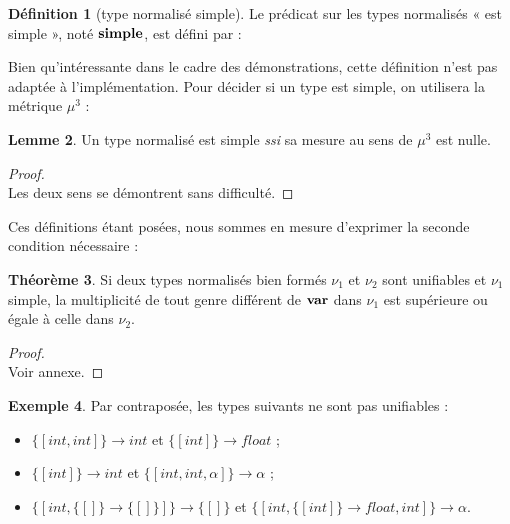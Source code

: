 \documentclass[a4paper]{report}
\newenvironment{preuve} 
  {\begin{proof}~\\} 
  {\end{proof}}
\theoremstyle{definition}
\newtheorem{theoreme}{Théorème}
\newtheorem{definition}[theoreme]{Définition}
\newtheorem{lemme}[theoreme]{Lemme}
\newtheorem{exemple}[theoreme]{Exemple}
\newcommand{\interval}[2]{[\![#1\,;#2]\!]}
\newcommand{\mset}[1]{\{\![#1]\!\}}
\newcommand{\ssi}{\textit{ssi}\xspace}
\begin{document}
\begin{definition}[type normalisé simple]
  Le prédicat sur les types normalisés « est simple », noté $\bold{simple}$, est défini par :
\end{definition}

Bien qu'intéressante dans le cadre des démonstrations, cette définition n'est pas adaptée à l'implémentation. Pour décider si un type est simple, on utilisera la métrique $\mu^3$ :

\begin{lemme}
  Un type normalisé est simple \ssi sa mesure au sens de $\mu^3$ est nulle.
\end{lemme}

\begin{preuve}
  Les deux sens se démontrent sans difficulté.
\end{preuve}

Ces définitions étant posées, nous sommes en mesure d'exprimer la seconde condition nécessaire :

\begin{theoreme} \label{thm_cond2}
  Si deux types normalisés bien formés $\nu_1$ et $\nu_2$ sont unifiables et $\nu_1$ simple, la multiplicité de tout genre différent de $\bold{var}$ dans $\nu_1$ est supérieure ou égale à celle dans $\nu_2$.
\end{theoreme}

\begin{preuve}
	Voir annexe.
\end{preuve}

\begin{exemple}
  Par contraposée, les types suivants ne sont pas unifiables :
  \begin{itemize}
    \item $\mset{int, int} \rightarrow int$ et $\mset{int} \rightarrow float$ ;
    \item $\mset{int} \rightarrow int$ et $\mset{int, int, \alpha} \rightarrow \alpha$ ;
    \item $\mset{int, \mset{} \rightarrow \mset{}} \rightarrow \mset{}$ et $\mset{int, \mset{int} \rightarrow float, int} \rightarrow \alpha$.
  \end{itemize}
\end{exemple}
\end{document}
